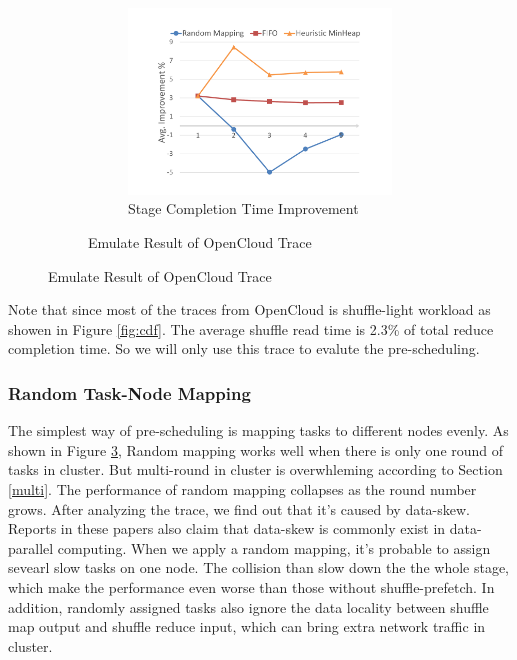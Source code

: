 \documentclass[10pt,twocolumn]{article}
\begin{document}
\begin{figure}
\begin{minipage}{0.65\linewidth}
\begin{figure}[H]
			\begin{subfigure}{0.5\textwidth}
				\includegraphics[width=\linewidth]{fig/sim}
				\caption{Stage Completion Time Improvement}
				\label{fig:sim}
			\end{subfigure}	
			\caption{Emulate Result of OpenCloud Trace}
		\end{figure}
	\end{minipage}
\end{figure}
Note that since most of the traces from OpenCloud is shuffle-light workload as showen in Figure \ref{fig:cdf}. The average shuffle read time is 2.3\% of total reduce completion time. So we will only use this trace to evalute the pre-scheduling. 
\subsubsection{Random Task-Node Mapping}
The simplest way of pre-scheduling is mapping tasks to different nodes evenly. As shown in Figure \ref{fig:sim}, Random mapping works well when there is only one round of tasks in cluster. But multi-round in cluster is overwhleming according to Section \ref{multi}. The performance of random mapping collapses as the round number grows. After analyzing the trace, we find out that it's caused by data-skew. Reports in these papers\cite{skewtune, reining, gufler2012load} also claim that data-skew is commonly exist in data-parallel computing. When we apply a random mapping, it's probable to assign sevearl slow tasks on one node. The collision than slow down the the whole stage, which make the performance even worse than those without shuffle-prefetch. In addition, randomly assigned tasks also ignore the data locality between shuffle map output and shuffle reduce input, which can bring extra network traffic in cluster. 
\end{document}
